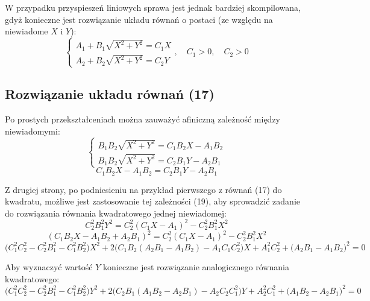 \documentclass[10pt]{article}
\begin{document}
W przypadku przyspieszeń liniowych sprawa jest jednak bardziej skompilowana, gdyż konieczne jest rozwiązanie układu równań o postaci (ze względu na niewiadome $X$ i $Y$):
\begin{equation}
\begin{cases}
A_1+B_1\sqrt{X^2 + Y^2} = C_1X \\ 
A_2+B_2\sqrt{X^2 + Y^2} = C_2Y
\end{cases}, \quad C_1 > 0, \quad C_2 > 0
\end{equation}

\subsection*{Rozwiązanie układu równań (17)}
Po prostych przekształceniach można zauważyć afiniczną zależność między niewiadomymi:
\begin{equation}
\begin{cases}
B_1 B_2 \sqrt{X^2 + Y^2} = C_1 B_2 X - A_1 B_2 \\ 
B_1 B_2 \sqrt{X^2 + Y^2} = C_2 B_1 Y - A_2 B_1
\end{cases}
\end{equation}
\begin{equation}
C_1 B_2 X - A_1 B_2 = C_2 B_1 Y - A_2 B_1
\end{equation}

Z drugiej strony, po podniesieniu na przykład pierwszego z równań (17) do kwadratu, możliwe jest zastosowanie tej zależności (19), aby sprowadzić zadanie do rozwiązania równania kwadratowego jednej niewiadomej:
\begin{equation}
C_2^2 B_1^2 Y^2 = C_2^2 (C_1 X - A_1)^2 - C_2^2 B_1^2 X^2
\end{equation}
\begin{equation}
(C_1 B_2 X - A_1 B_2 + A_2 B_1)^2 = C_2^2 (C_1 X - A_1)^2 - C_2^2 B_1^2 X^2
\end{equation}
\begin{equation}
\big(C_1^2 C_2^2 - C_2^2 B_1^2 - C_1^2 B_2^2 \big) X^2 + 
2\big(C_1B_2 (A_2B_1 - A_1B_2) - A_1C_1C_2^2 \big) X +
A_1^2 C_2^2 + \big(A_2B_1 - A_1B_2 \big)^2
 = 0
\end{equation}

Aby wyznaczyć wartość $Y$ konieczne jest rozwiązanie analogicznego równania kwadratowego:
\begin{equation}
\big(C_1^2 C_2^2 - C_2^2 B_1^2 - C_1^2 B_2^2 \big) Y^2 + 
2\big(C_2B_1 (A_1B_2 - A_2B_1) - A_2C_2C_1^2 \big) Y +
A_2^2 C_1^2 + \big(A_1B_2 - A_2B_1 \big)^2
 = 0
\end{equation}
\end{document}
